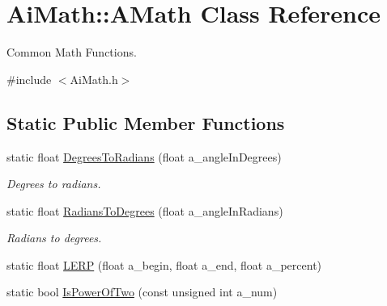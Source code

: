 \hypertarget{class_ai_math_1_1_a_math}{\section{Ai\+Math\+:\+:A\+Math Class Reference}
\label{class_ai_math_1_1_a_math}
}


Common Math Functions.  




{\ttfamily \#include $<$Ai\+Math.\+h$>$}

\subsection*{Static Public Member Functions}
\begin{DoxyCompactItemize}
\item 
\hypertarget{class_ai_math_1_1_a_math_a5e96ac25d8d78fe49df5511b1dc71854}{static float \hyperlink{class_ai_math_1_1_a_math_a5e96ac25d8d78fe49df5511b1dc71854}{Degrees\+To\+Radians} (float a\+\_\+angle\+In\+Degrees)}\label{class_ai_math_1_1_a_math_a5e96ac25d8d78fe49df5511b1dc71854}

\begin{DoxyCompactList}\small\item\em Degrees to radians. \end{DoxyCompactList}\item 
\hypertarget{class_ai_math_1_1_a_math_abe8fabdbb05f5234165c1bb3ca6b4772}{static float \hyperlink{class_ai_math_1_1_a_math_abe8fabdbb05f5234165c1bb3ca6b4772}{Radians\+To\+Degrees} (float a\+\_\+angle\+In\+Radians)}\label{class_ai_math_1_1_a_math_abe8fabdbb05f5234165c1bb3ca6b4772}

\begin{DoxyCompactList}\small\item\em Radians to degrees. \end{DoxyCompactList}\item 
static float \hyperlink{class_ai_math_1_1_a_math_af2859545b5704e2ba9121b2ac59a3cd8}{L\+E\+R\+P} (float a\+\_\+begin, float a\+\_\+end, float a\+\_\+percent)
\item 
\hypertarget{class_ai_math_1_1_a_math_a2379caaf0735e0564d02a33bcec1300c}{static bool \hyperlink{class_ai_math_1_1_a_math_a2379caaf0735e0564d02a33bcec1300c}{Is\+Power\+Of\+Two} (const unsigned int a\+\_\+num)}\label{class_ai_math_1_1_a_math_a2379caaf0735e0564d02a33bcec1300c}


\end{DoxyCompactItemize}
